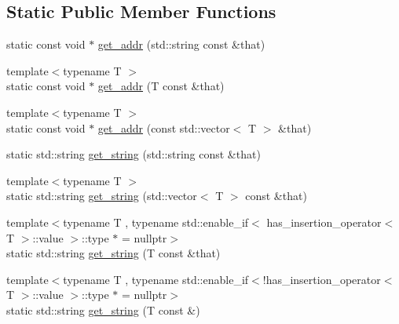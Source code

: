 \subsection*{Static Public Member Functions}
\begin{DoxyCompactItemize}
\item 
static const void $\ast$ \hyperlink{structpfq_1_1lang_1_1StorableShowBase_a716426f3a3c0a37e5cbce068dc18cda5}{get\+\_\+addr} (std\+::string const \&that)
\item 
{\footnotesize template$<$typename T $>$ }\\static const void $\ast$ \hyperlink{structpfq_1_1lang_1_1StorableShowBase_abbf4497b2a5de3ee38e9ee1c7ffd734d}{get\+\_\+addr} (T const \&that)
\item 
{\footnotesize template$<$typename T $>$ }\\static const void $\ast$ \hyperlink{structpfq_1_1lang_1_1StorableShowBase_a4bc431bc15a71b7ae20964e2685a35cf}{get\+\_\+addr} (const std\+::vector$<$ T $>$ \&that)
\item 
static std\+::string \hyperlink{structpfq_1_1lang_1_1StorableShowBase_a9e69c1f0fd60de5a72662bf6e958c4db}{get\+\_\+string} (std\+::string const \&that)
\item 
{\footnotesize template$<$typename T $>$ }\\static std\+::string \hyperlink{structpfq_1_1lang_1_1StorableShowBase_aec6a0735276796b19a8035d35e770116}{get\+\_\+string} (std\+::vector$<$ T $>$ const \&that)
\item 
{\footnotesize template$<$typename T , typename std\+::enable\+\_\+if$<$ has\+\_\+insertion\+\_\+operator$<$\+T $>$\+::value $>$\+::type $\ast$  = nullptr$>$ }\\static std\+::string \hyperlink{structpfq_1_1lang_1_1StorableShowBase_a882c1bc29fbb4c81d9d483201864f41d}{get\+\_\+string} (T const \&that)
\item 
{\footnotesize template$<$typename T , typename std\+::enable\+\_\+if$<$!has\+\_\+insertion\+\_\+operator$<$\+T $>$\+::value $>$\+::type $\ast$  = nullptr$>$ }\\static std\+::string \hyperlink{structpfq_1_1lang_1_1StorableShowBase_ac5fb47fc6cf85e5279a8aff258173e49}{get\+\_\+string} (T const \&)
\end{DoxyCompactItemize}


